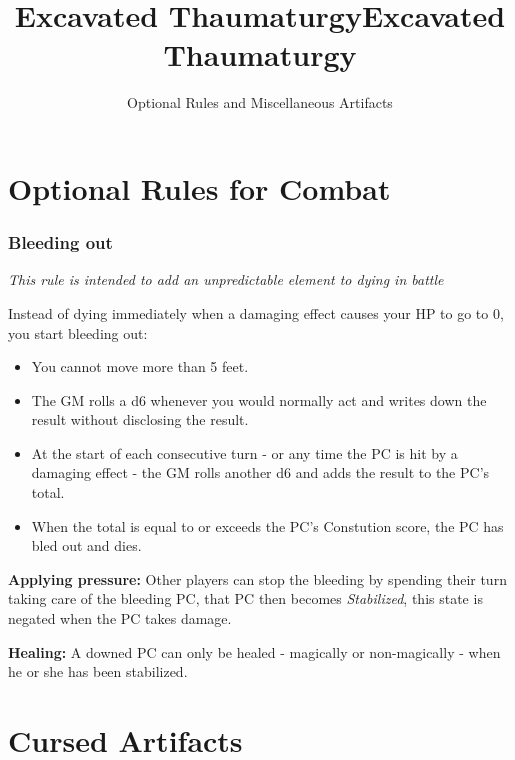 \documentclass[letterpaper,sansserif,tightsqueeze]{rpg-module}
\title{Excavated Thaumaturgy}
\begin{document}
\twocolumn

\title{Excavated Thaumaturgy}

\subtitle{Optional Rules and Miscellaneous Artifacts}




\maketitle

\vspace{0.5cm}
\part*{Optional Rules for Combat}
\vspace{0.5cm}

\section{Bleeding out}
\textit{This rule is intended to add an unpredictable element to dying in battle}

Instead of dying immediately when a damaging effect causes your HP to go to 0, you start bleeding out:
\begin{itemize}
	\item You cannot move more than 5 feet.
	\item The GM rolls a d6 whenever you would normally act and writes down the result without disclosing the result.
	\item At the start of each consecutive turn - or any time the PC is hit by a damaging effect - the GM rolls another d6 and adds the result to the PC's total.
	\item When the total is equal to or exceeds the PC's Constution score, the PC has bled out and dies.
\end{itemize}
\textbf{Applying pressure:} Other players can stop the bleeding by spending their turn taking care of the bleeding PC, that PC then becomes \textit{Stabilized}, this state is negated when the PC takes damage.

\textbf{Healing:} A downed PC can only be healed - magically or non-magically - when he or she has been stabilized.

\newpage

\vspace{0.5cm}
\part*{Cursed Artifacts}
\vspace{0.5cm}
\end{document}
